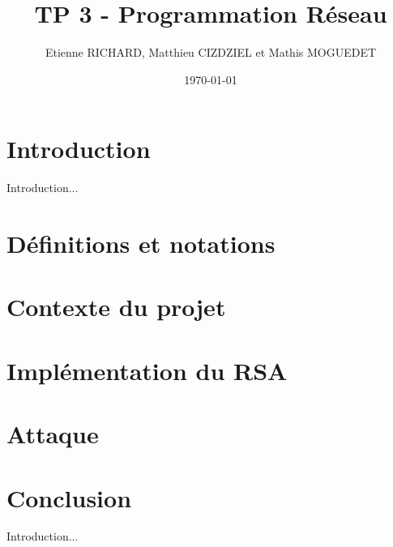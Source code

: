 \documentclass[12pt]{article}
\title{TP 3 - Programmation Réseau}	\let\Title\@title
\author{Etienne RICHARD, Matthieu CIZDZIEL et Mathis MOGUEDET} \let\Author\@author
\date{\today}           	\let\Date\@date
\begin{document}
\maketitle
\pagebreak

\tableofcontents
\pagebreak

\section*{Introduction}
Introduction...

\pagebreak
\section{Définitions et notations}


\pagebreak
\section{Contexte du projet}


\pagebreak
\section{Implémentation du RSA}


\section{Attaque}


\section*{Conclusion}
Introduction...

\medskip
\printbibliography
\end{document}
